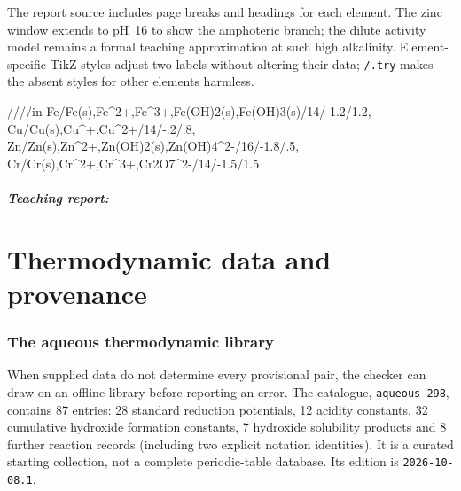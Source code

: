 \documentclass[a4paper,11pt]{ltxdoc}
\begin{document}
The report source includes page breaks and headings for each element.
The zinc window extends to pH~16 to show the amphoteric branch; the dilute
activity model remains a formal teaching approximation at such high alkalinity.
Element-specific TikZ styles adjust two labels without altering their data;
\texttt{/.try} makes the absent styles for other elements harmless.

\begin{codeexample}
\foreach \Element/\Species/\pHmax/\Emin/\Emax in {
 Fe/{Fe(s),Fe^2+,Fe^3+,Fe(OH)2(s),Fe(OH)3(s)}/14/-1.2/1.2,
 Cu/{Cu(s),Cu^+,Cu^2+}/14/-.2/.8,
 Zn/{Zn(s),Zn^2+,Zn(OH)2(s),Zn(OH)4^2-}/16/-1.8/.5,
 Cr/{Cr(s),Cr^2+,Cr^3+,Cr2O7^2-}/14/-1.5/1.5}{
  \tikzset{pourbaix/report \Element/.try}
  \clearpage
  \subsubsection*{Teaching report: \Element}
}
\end{codeexample}
\clearpage

\clearpage\part{Thermodynamic data and provenance}\label{part:data}
\section{The aqueous thermodynamic library}
\label{sec:database}
When supplied data do not determine every provisional pair, the checker can draw
on an offline library before reporting an error. The catalogue,
\texttt{aqueous-298}, contains 87 entries: 28 standard reduction potentials,
12 acidity constants, 32 cumulative hydroxide formation constants, 7
hydroxide solubility products and 8 further reaction records (including two
explicit notation identities). It is a curated starting collection, not a complete
periodic-table database. Its edition is \texttt{2026-10-08.1}.
\end{document}

